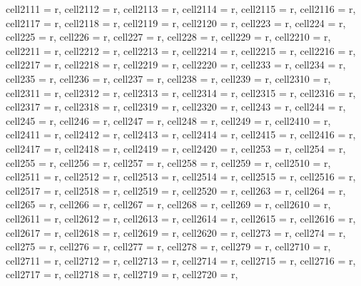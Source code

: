 \documentclass[journal]{IEEEtran}
\begin{document}
\begin{table}
\begin{adjustbox}{width=\textwidth}
\begin{tblr}
{  cell{21}{11} = {r},
  cell{21}{12} = {r},
  cell{21}{13} = {r},
  cell{21}{14} = {r},
  cell{21}{15} = {r},
  cell{21}{16} = {r},
  cell{21}{17} = {r},
  cell{21}{18} = {r},
  cell{21}{19} = {r},
  cell{21}{20} = {r},
  cell{22}{3} = {r},
  cell{22}{4} = {r},
  cell{22}{5} = {r},
  cell{22}{6} = {r},
  cell{22}{7} = {r},
  cell{22}{8} = {r},
  cell{22}{9} = {r},
  cell{22}{10} = {r},
  cell{22}{11} = {r},
  cell{22}{12} = {r},
  cell{22}{13} = {r},
  cell{22}{14} = {r},
  cell{22}{15} = {r},
  cell{22}{16} = {r},
  cell{22}{17} = {r},
  cell{22}{18} = {r},
  cell{22}{19} = {r},
  cell{22}{20} = {r},
  cell{23}{3} = {r},
  cell{23}{4} = {r},
  cell{23}{5} = {r},
  cell{23}{6} = {r},
  cell{23}{7} = {r},
  cell{23}{8} = {r},
  cell{23}{9} = {r},
  cell{23}{10} = {r},
  cell{23}{11} = {r},
  cell{23}{12} = {r},
  cell{23}{13} = {r},
  cell{23}{14} = {r},
  cell{23}{15} = {r},
  cell{23}{16} = {r},
  cell{23}{17} = {r},
  cell{23}{18} = {r},
  cell{23}{19} = {r},
  cell{23}{20} = {r},
  cell{24}{3} = {r},
  cell{24}{4} = {r},
  cell{24}{5} = {r},
  cell{24}{6} = {r},
  cell{24}{7} = {r},
  cell{24}{8} = {r},
  cell{24}{9} = {r},
  cell{24}{10} = {r},
  cell{24}{11} = {r},
  cell{24}{12} = {r},
  cell{24}{13} = {r},
  cell{24}{14} = {r},
  cell{24}{15} = {r},
  cell{24}{16} = {r},
  cell{24}{17} = {r},
  cell{24}{18} = {r},
  cell{24}{19} = {r},
  cell{24}{20} = {r},
  cell{25}{3} = {r},
  cell{25}{4} = {r},
  cell{25}{5} = {r},
  cell{25}{6} = {r},
  cell{25}{7} = {r},
  cell{25}{8} = {r},
  cell{25}{9} = {r},
  cell{25}{10} = {r},
  cell{25}{11} = {r},
  cell{25}{12} = {r},
  cell{25}{13} = {r},
  cell{25}{14} = {r},
  cell{25}{15} = {r},
  cell{25}{16} = {r},
  cell{25}{17} = {r},
  cell{25}{18} = {r},
  cell{25}{19} = {r},
  cell{25}{20} = {r},
  cell{26}{3} = {r},
  cell{26}{4} = {r},
  cell{26}{5} = {r},
  cell{26}{6} = {r},
  cell{26}{7} = {r},
  cell{26}{8} = {r},
  cell{26}{9} = {r},
  cell{26}{10} = {r},
  cell{26}{11} = {r},
  cell{26}{12} = {r},
  cell{26}{13} = {r},
  cell{26}{14} = {r},
  cell{26}{15} = {r},
  cell{26}{16} = {r},
  cell{26}{17} = {r},
  cell{26}{18} = {r},
  cell{26}{19} = {r},
  cell{26}{20} = {r},
  cell{27}{3} = {r},
  cell{27}{4} = {r},
  cell{27}{5} = {r},
  cell{27}{6} = {r},
  cell{27}{7} = {r},
  cell{27}{8} = {r},
  cell{27}{9} = {r},
  cell{27}{10} = {r},
  cell{27}{11} = {r},
  cell{27}{12} = {r},
  cell{27}{13} = {r},
  cell{27}{14} = {r},
  cell{27}{15} = {r},
  cell{27}{16} = {r},
  cell{27}{17} = {r},
  cell{27}{18} = {r},
  cell{27}{19} = {r},
  cell{27}{20} = {r},
}
\hline\hline %

\end{tblr}
\end{adjustbox}
\end{table}
\end{document}
